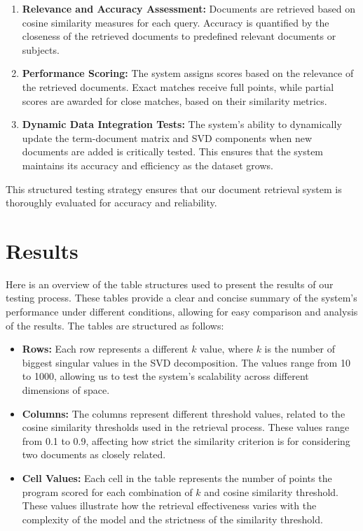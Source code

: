 \documentclass[12pt,a4paper]{article}
\begin{document}
\begin{enumerate}
    \item \textbf{Relevance and Accuracy Assessment:} Documents are retrieved based on cosine similarity measures for each query. Accuracy is quantified by the closeness of the retrieved documents to predefined relevant documents or subjects.
    \item \textbf{Performance Scoring:} The system assigns scores based on the relevance of the retrieved documents. Exact matches receive full points, while partial scores are awarded for close matches, based on their similarity metrics.
    \item \textbf{Dynamic Data Integration Tests:} The system's ability to dynamically update the term-document matrix and SVD components when new documents are added is critically tested. This ensures that the system maintains its accuracy and efficiency as the dataset grows.
\end{enumerate}

\noindent
This structured testing strategy ensures that our document retrieval system is thoroughly evaluated for accuracy and reliability.

\newpage

\section{Results}
Here is an overview of the table structures used to present the results of our testing process. These tables provide a clear and concise summary of the system's performance under different conditions, allowing for easy comparison and analysis of the results. The tables are structured as follows:
\begin{itemize}
  \item \textbf{Rows:} Each row represents a different \( k \) value, where \( k \) is the number of biggest singular values in the SVD decomposition. The values range from 10 to 1000, allowing us to test the system's scalability across different dimensions of space.
  \item \textbf{Columns:} The columns represent different threshold values, related to the cosine similarity thresholds used in the retrieval process. These values range from 0.1 to 0.9, affecting how strict the similarity criterion is for considering two documents as closely related.
  \item \textbf{Cell Values:} Each cell in the table represents the number of points the program scored for each combination of \( k \) and cosine similarity threshold. These values illustrate how the retrieval effectiveness varies with the complexity of the model and the strictness of the similarity threshold.
\end{itemize}
\end{document}
